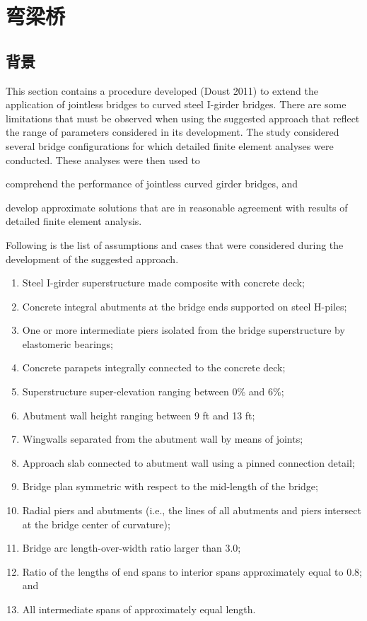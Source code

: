 \chapter{弯梁桥}
\section{背景}
This section contains a procedure developed (Doust 2011) to extend the application of jointless bridges to curved steel I-girder bridges. There are some limitations that must be observed when using the suggested approach that
reflect the range of parameters considered in its development. The study considered several bridge configurations for which detailed finite element analyses were conducted. These analyses were then used to 
\begin{enumerate*}
  \item comprehend the performance of jointless curved girder bridges, and
  \item develop approximate solutions that are in reasonable agreement with results of detailed finite element analysis.
\end{enumerate*}
Following is the list of assumptions and cases that were considered during the development of the suggested approach.
\begin{enumerate}
  \item Steel I-girder superstructure made composite with concrete deck;
  \item Concrete integral abutments at the bridge ends supported on steel H-piles;
  \item One or more intermediate piers isolated from the bridge superstructure by elastomeric bearings;
  \item Concrete parapets integrally connected to the concrete deck;
  \item Superstructure super-elevation ranging between 0\% and 6\%;
  \item Abutment wall height ranging between 9 ft and 13 ft;
  \item Wingwalls separated from the abutment wall by means of joints;
  \item Approach slab connected to abutment wall using a pinned connection detail;
  \item Bridge plan symmetric with respect to the mid-length of the bridge;
  \item Radial piers and abutments (i.e., the lines of all abutments and piers intersect at the bridge center of curvature);
  \item Bridge arc length-over-width ratio larger than 3.0;
  \item Ratio of the lengths of end spans to interior spans approximately equal to 0.8; and
  \item All intermediate spans of approximately equal length.
\end{enumerate}


